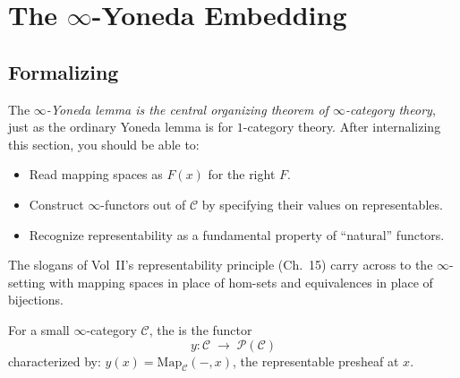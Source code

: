 \section{The $\infty$-Yoneda Embedding}
\label{sec:yoneda-embedding}

\subsection{Formalizing}

\begin{readernote}
The \emph{$\infty$-Yoneda lemma is the central organizing theorem of
$\infty$-category theory}, just as the ordinary Yoneda lemma is for
$1$-category theory. After internalizing this section, you should be
able to:
\begin{itemize}
  \item Read mapping spaces as $F(x)$ for the right $F$.
  \item Construct $\infty$-functors out of $\mathcal{C}$ by specifying
        their values on representables.
  \item Recognize representability as a fundamental property of
        ``natural'' functors.
\end{itemize}
The slogans of Vol~II's representability principle (Ch.~15) carry
across to the $\infty$-setting with mapping spaces in place of hom-sets
and equivalences in place of bijections.
\end{readernote}

\begin{definition}
\label{def:yoneda-embedding-qcat}
For a small $\infty$-category $\mathcal{C}$, the  is the functor
\begin{equation*}
  y : \mathcal{C} \;\longrightarrow\; \mathcal{P}(\mathcal{C})
\end{equation*}
characterized by: $y(x) = \mathrm{Map}_\mathcal{C}(-, x)$, the
representable presheaf at $x$.
\end{definition}

